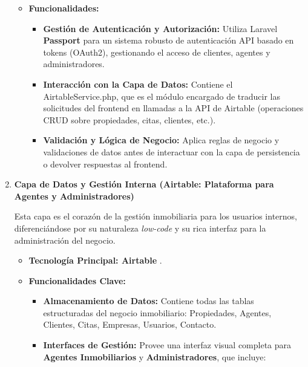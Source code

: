 \begin{enumerate}
\begin{itemize}
        \item \textbf{Funcionalidades:}
        
        \begin{itemize}
            \item \textbf{Gestión de Autenticación y Autorización:} Utiliza Laravel \textbf{Passport} para un sistema robusto de autenticación API basado en tokens (OAuth2), gestionando el acceso de clientes, agentes y administradores.

            \item \textbf{Interacción con la Capa de Datos:} Contiene el AirtableService.php, que es el módulo encargado de traducir las solicitudes del frontend en llamadas a la API de Airtable (operaciones CRUD sobre propiedades, citas, clientes, etc.).

            \item \textbf{Validación y Lógica de Negocio:} Aplica reglas de negocio y validaciones de datos antes de interactuar con la capa de persistencia o devolver respuestas al frontend.
        \end{itemize}
        
    \end{itemize}

    \item \textbf{Capa de Datos y Gestión Interna (Airtable: Plataforma para Agentes y Administradores)}

    Esta capa es el corazón de la gestión inmobiliaria para los usuarios internos, diferenciándose por su naturaleza \textit{low-code} y su rica interfaz para la administración del negocio.

    \begin{itemize}
        \item \textbf{Tecnología Principal: Airtable} \cite{airtable2024basics} \cite{airtable2024developers} \cite{airtable2024support}.
        
        \item \textbf{Funcionalidades Clave:}
        
        \begin{itemize}
            \item \textbf{Almacenamiento de Datos:} Contiene todas las tablas estructuradas del negocio inmobiliario: Propiedades, Agentes, Clientes, Citas, Empresas, Usuarios, Contacto.

            \item \textbf{Interfaces de Gestión:} Provee una interfaz visual completa para \textbf{Agentes Inmobiliarios} y \textbf{Administradores}, que incluye:


\end{itemize}
\end{itemize}
\end{enumerate}
